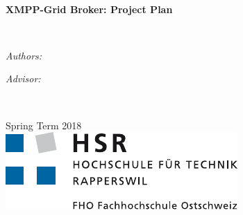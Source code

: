 

\usepackage{tabu}
\usepackage{diagbox}
\usepackage{float}
\usepackage{multicol}
\usepackage{url}



\frontmatter


\begin{titlepage}
\begin{center}
\vspace*{.06\textheight}

\HRule \\[0.4cm] %
{\huge \bfseries XMPP-Grid Broker: Project Plan\par}\vspace{0.4cm} %
\HRule \\[1.5cm] %

\begin{minipage}[t]{0.4\textwidth}
\begin{flushleft} \large
\emph{Authors:}\\
\authorname %
\end{flushleft}
\end{minipage}
\begin{minipage}[t]{0.4\textwidth}
\begin{flushright} \large
\emph{Advisor:} \\
\supname
\end{flushright}
\end{minipage}\\[3cm]

\vfill

{\large Spring Term 2018}\\[4cm] %
\includegraphics{resources/logo_hsr} %

\vfill
\end{center}
\end{titlepage}


